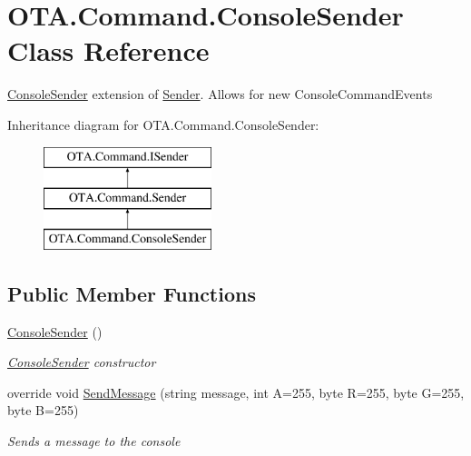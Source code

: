 \hypertarget{class_o_t_a_1_1_command_1_1_console_sender}{}\section{O\+T\+A.\+Command.\+Console\+Sender Class Reference}
\label{class_o_t_a_1_1_command_1_1_console_sender}


\hyperlink{class_o_t_a_1_1_command_1_1_console_sender}{Console\+Sender} extension of \hyperlink{class_o_t_a_1_1_command_1_1_sender}{Sender}. Allows for new Console\+Command\+Events  


Inheritance diagram for O\+T\+A.\+Command.\+Console\+Sender\+:\begin{figure}[H]
\begin{center}
\leavevmode
\includegraphics[height=3.000000cm]{class_o_t_a_1_1_command_1_1_console_sender}
\end{center}
\end{figure}
\subsection*{Public Member Functions}
\begin{DoxyCompactItemize}
\item 
\hyperlink{class_o_t_a_1_1_command_1_1_console_sender_a0392fc06bb67e8870eeb541229f21d95}{Console\+Sender} ()
\begin{DoxyCompactList}\small\item\em \hyperlink{class_o_t_a_1_1_command_1_1_console_sender}{Console\+Sender} constructor \end{DoxyCompactList}\item 
override void \hyperlink{class_o_t_a_1_1_command_1_1_console_sender_ab1569d02090c217a52d8e25f6846504c}{Send\+Message} (string message, int A=255, byte R=255, byte G=255, byte B=255)
\begin{DoxyCompactList}\small\item\em Sends a message to the console \end{DoxyCompactList}\end{DoxyCompactItemize}
